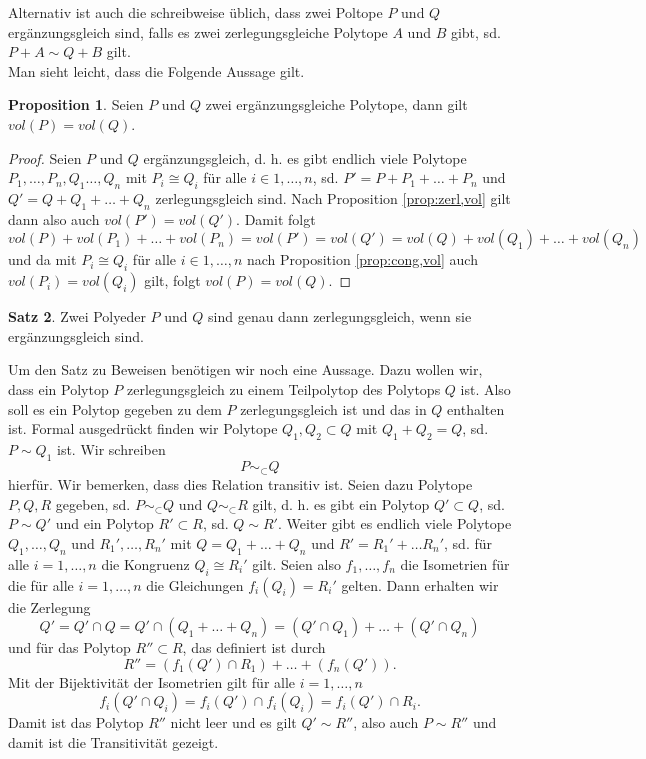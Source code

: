 \documentclass[11pt,titlepage]{article}
\theoremstyle{definition}
\newtheorem{theorem}{Satz}[section]
\newtheorem{proposition}[theorem]{Proposition}
\theoremstyle{remark}
\begin{document}
	Alternativ ist auch die schreibweise üblich, dass zwei Poltope $P$ und $Q$
	ergänzungsgleich sind, falls es zwei zerlegungsgleiche Polytope 
	$A$ und $B$ gibt, sd. $P+A\sim Q+B$ gilt. \\
	Man sieht leicht, dass die Folgende Aussage gilt.
	
	\begin{proposition}\label{coroll:ergvol}
		Seien $P$ und $Q$ zwei ergänzungsgleiche Polytope, dann gilt $vol(P)=vol(Q)$.
	\end{proposition}
	
	\begin{proof}
		Seien $P$ und $Q$ ergänzungsgleich, d. h. es gibt endlich viele Polytope $P_1,\ldots,P_n,
		Q_1\ldots,Q_n$ mit $P_i\cong Q_i$ für alle $i\in{1,\ldots,n}$, sd. 
		$P'=P+P_1+\ldots+P_n$ und $Q'=Q+Q_1+\ldots+Q_n$ zerlegungsgleich sind. Nach 
		Proposition \ref{prop:zerl,vol} gilt dann also auch $vol(P')=vol(Q')$. Damit folgt
		\[vol(P)+vol(P_1)+\ldots+vol(P_n)=vol(P')=vol(Q')=vol(Q)+vol(Q_1)+\ldots+vol(Q_n)\]
		und da mit $P_i\cong Q_i$ für alle $i\in{1,\ldots,n}$ nach Proposition \ref{prop:cong,vol} 
		auch $vol(P_i)=vol(Q_i)$ gilt, folgt $vol(P)=vol(Q)$.
	\end{proof}
	
	\begin{theorem} \label{thm:zerlerg}
		Zwei Polyeder $P$ und $Q$ sind genau dann zerlegungsgleich, wenn 
		sie ergänzungsgleich sind.
	\end{theorem}
	
	Um den Satz zu Beweisen benötigen wir noch eine Aussage. Dazu wollen 
	wir, dass ein Polytop $P$ zerlegungsgleich zu einem Teilpolytop 
	des Polytops $Q$ ist. Also soll es ein Polytop gegeben zu dem 
	$P$ zerlegungsgleich ist und das in $Q$ enthalten ist. Formal 
	ausgedrückt finden wir Polytope $Q_1,Q_2\subset Q$ mit 
	$Q_1+Q_2=Q$, sd. $P\sim Q_1$ ist. Wir schreiben 
	\[P\sim_{\subset} Q\]
	hierfür. Wir bemerken, dass dies Relation transitiv ist. Seien 
	dazu Polytope $P,Q,R$ gegeben, sd. $P\sim_{\subset}Q$ und $Q\sim_{\subset}R$ 
	gilt, d. h. es gibt ein Polytop $Q'\subset Q$, sd. $P\sim Q'$ und ein Polytop 
	$R'\subset R$, sd. $Q\sim R'$. Weiter gibt es endlich viele Polytope 
	$Q_1,\ldots,Q_n$ und $R_1',\ldots,R_n'$ mit $Q=Q_1+\ldots+Q_n$ und 
	$R'=R_1'+\ldots R_n'$, sd. für alle $i=1,\ldots,n$ die 
	Kongruenz $Q_i\cong R_i'$ gilt. 
	Seien also $f_1,\ldots,f_n$ die Isometrien für die für 
	alle $i=1,\ldots,n$ die Gleichungen $f_i(Q_i)=R_i'$ gelten. Dann erhalten wir 
	die Zerlegung
	\[Q'=Q'\cap Q=Q'\cap(Q_1+\ldots+Q_n)=(Q'\cap Q_1)+\ldots+(Q'\cap Q_n)\]
	und für das Polytop $R''\subset R$, das definiert ist durch 
	\[R''=(f_1(Q')\cap R_1)+\ldots+(f_n(Q')).\]
	Mit der Bijektivität der Isometrien gilt für alle $i=1,\ldots,n$
	\[f_i(Q'\cap Q_i)=f_i(Q')\cap f_i(Q_i)=f_i(Q')\cap R_i.\]
	Damit ist das Polytop $R''$ nicht leer und es gilt $Q'\sim R''$, also auch 
	$P\sim R''$ und damit ist die Transitivität gezeigt.
	
\end{document}
